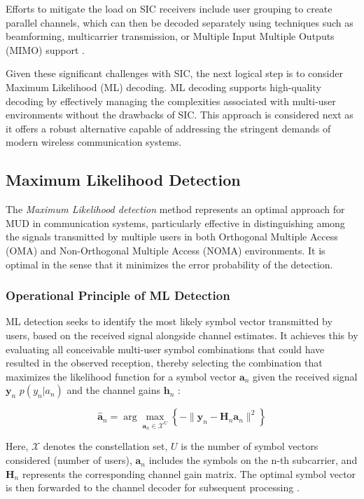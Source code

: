 Efforts to mitigate the load on SIC receivers include user grouping to create parallel channels, which can then be decoded separately using techniques such as beamforming, multicarrier transmission, or Multiple Input Multiple Outputs (MIMO) support \cite{NAGMA}.

Given these significant challenges with SIC, the next logical step is to consider Maximum Likelihood (ML) decoding. ML decoding supports high-quality decoding by effectively managing the complexities associated with multi-user environments without the drawbacks of SIC. This approach is considered next as it offers a robust alternative capable of addressing the stringent demands of modern wireless communication systems.
\subsection{Maximum Likelihood Detection }

The \textit{Maximum Likelihood detection} method represents an optimal approach for MUD in communication systems, particularly effective in distinguishing among the signals transmitted by multiple users in both Orthogonal Multiple Access (OMA) and Non-Orthogonal Multiple Access (NOMA) environments. It is optimal in the sense that it minimizes the
error probability of the detection.

\subsubsection*{Operational Principle of ML Detection}

ML detection seeks to identify the most likely symbol vector transmitted by users, based on the received signal alongside channel estimates. It achieves this by evaluating all conceivable multi-user symbol combinations that could have resulted in the observed reception, thereby selecting the combination that maximizes the likelihood function for a symbol vector \(\mathbf{a}_n\) given the received signal \(\mathbf{y}_n\) \( p(y_n | a_n) \) and the channel gains \(\mathbf{h}_n\) :

\begin{equation}
\hat{\mathbf{a}}_n = \arg\max_{\mathbf{a}_n \in \mathcal{X}^U} \left\{ -\|\mathbf{y}_n - \mathbf{H}_n \mathbf{a}_n\|^2 \right\}
\end{equation}

Here, \(\mathcal{X}\) denotes the constellation set, \(U\) is the number of symbol vectors considered (number of users), \(\mathbf{a}_n\) includes the symbols on the n-th subcarrier, and \(\mathbf{H}_n\) represents the corresponding channel gain matrix. The optimal symbol vector is then forwarded to the channel decoder for subsequent processing \cite{ML1}.

